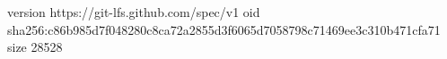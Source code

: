 version https://git-lfs.github.com/spec/v1
oid sha256:c86b985d7f048280c8ca72a2855d3f6065d7058798c71469ee3c310b471cfa71
size 28528
